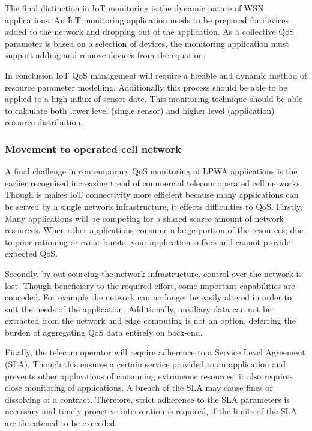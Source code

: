 The final distinction in IoT monitoring is the dynamic nature of WSN applications. An IoT monitoring application needs to be prepared for devices added to the network and dropping out of the application. As a collective QoS parameter is based on a selection of devices, the monitoring application must support adding and remove devices from the equation.

In conclusion IoT QoS management will require a flexible and dynamic method of resource parameter modelling. Additionally this process should be able to be applied to a high influx of sensor date. This monitoring technique should be able to calculate both lower level (single sensor) and higher level (application) resource distribution.

\subsubsection{Movement to operated cell network}
A final challenge in contemporary QoS monitoring of LPWA applications is the earlier recognised increasing trend of commercial telecom operated cell networks. Though is makes IoT connectivity more efficient because many applications can be served by a single network infrastructure, it  effects difficulties to QoS. Firstly, Many applications will be competing for a shared scarce amount of network resources. When other applications consume a large portion of the resources, due to poor rationing or event-bursts, your application suffers and cannot provide expected QoS.

Secondly, by out-sourcing the network infrastructure, control over the network is lost. Though beneficiary to the required effort, some important capabilities are conceded. For example the network can no longer be easily altered in order to suit the needs of the application. Additionally, auxiliary data can not be extracted from the network and edge computing is not an option, deferring the burden of aggregating QoS data entirely on back-end.

Finally, the telecom operator will require adherence to a Service Level Agreement (SLA). Though this ensures a certain service provided to an application and prevents other applications of consuming extraneous resources, it also requires close monitoring of applications. A breach of the SLA may cause fines or dissolving of a contract. Therefore, strict adherence to the SLA parameters is necessary and timely proactive intervention is required, if the limits of the SLA are threatened to be exceeded.\cite{cloud_computing_monitoring}

